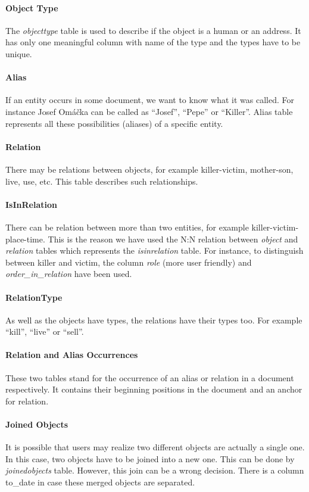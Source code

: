 \paragraph{Object Type} The \emph{objecttype} table is used to describe if the
object is a human or an address. It has only one meaningful column with name of
the type and the types have to be unique.

\paragraph{Alias} If an entity occurs in some document, we want to know what it
was called. For instance Josef Omáčka can be called as ``Josef'', ``Pepe'' or
``Killer''. Alias table represents all these possibilities (aliases) 
of a specific entity.

\paragraph{Relation} There may be relations between objects, for example
killer-victim, mother-son, live, use, etc. This table describes such
relationships. 

\paragraph{IsInRelation} There can be relation between more than two entities,
for example  killer-victim-place-time. This is the reason we have used the N:N
relation  between \emph{object} and \emph{relation} tables which represents the
\emph{isinrelation} table. For instance, to distinguish between killer and
victim, the column \emph{role} (more user friendly) and
\emph{order\_{}in\_{}relation} have been used.

\paragraph{RelationType} As well as the objects have types, the relations have their
types too. For example ``kill'', ``live'' or ``sell''.

\paragraph{Relation and Alias Occurrences} These two tables stand for the
occurrence of an alias or relation in a document respectively. It contains their
beginning positions in the document  and an anchor for relation. 

\paragraph{Joined Objects} It is possible that users may realize two different
objects are actually a single one. In this case, two objects have to be joined
into a new one. This can be done by \emph{joinedobjects} table. However, this
join can be a wrong decision. There is a column to\_{}date in case these merged
objects are separated.

